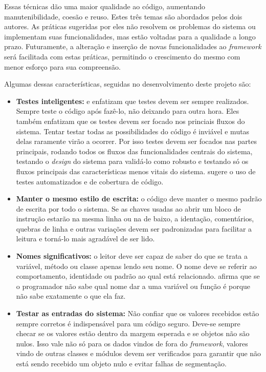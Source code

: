 Essas técnicas dão uma maior qualidade ao código, aumentando manutenibilidade, coesão e reuso. Estes três temas são abordados pelos dois autores. As práticas sugeridas por eles não resolvem os problemas do sistema ou implementam suas funcionalidades, mas estão voltadas para a qualidade a longo prazo. Futuramente, a alteração e inserção de novas funcionalidades ao \textit{framework} será facilitada com estas práticas, permitindo o crescimento do mesmo com menor esforço para sua compreensão.

Algumas dessas características, seguidas no desenvolvimento deste projeto são:

\begin{itemize}
  \item \textbf{Testes inteligentes:} \cite{Goodliffe2007} e \cite{McConnel2004} enfatizam que testes devem ser sempre realizados. Sempre teste o código após fazê-lo, não deixando para outra hora. Eles também enfatizam que os testes devem ser focado nos princiais fluxos do sistema. Tentar testar todas as possibilidades do código é inviável e mutas delas raramente virão a ocorrer. Por isso testes devem ser focados nas partes principais, rodando todos os fluxos das funcionalidades centrais do sistema, testando o \textit{design} do sistema para validá-lo como robusto e testando só os fluxos principais das características menos vitais do sistema. \cite{McConnel2004} sugere o uso de testes automatizados e de cobertura de código.
  \item \textbf{Manter o mesmo estilo de escrita:} o código deve manter o mesmo padrão de escrita por todo o sistema. Se as chaves usadas ao abrir um bloco de instrução estarão na mesma linha ou na de baixo, a identação, comentários, quebras de linha e outras variações devem ser padronizadas para facilitar a leitura e torná-lo mais agradável de ser lido.
  \item \textbf{Nomes significativos:} o leitor deve ser capaz de saber do que se trata a variável, método ou classe apenas lendo seu nome. O nome deve se referir ao comportamento, identidade ou padrão ao qual está relacionado. \cite{Goodliffe2007} afirma que se o programador não sabe qual nome dar a uma variável ou função é porque não sabe exatamente o que ela faz.
  \item \textbf{Testar as entradas do sistema:} Não confiar que os valores recebidos estão sempre corretos é indispensável para um código seguro. Deve-se sempre checar se os valores estão dentro da margem esperada e se objetos não são nulos. Isso vale não só para os dados vindos de fora do \textit{framework}, valores vindo de outras classes e módulos devem ser verificados para garantir que não está sendo recebido um objeto nulo e evitar falhas de segmentação.

\end{itemize}
